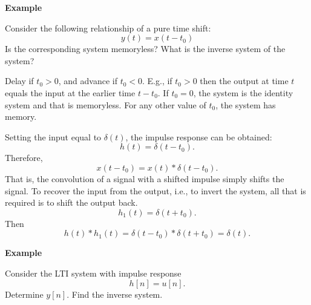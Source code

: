 \begin{frame}{}
    \textbf{ Example}\par
    Consider the following relationship of a pure time shift:
    \begin{equation*}
        y(t) = x(t-t_0)
    \end{equation*}
    Is the corresponding system memoryless? What is the inverse system of the system? \pause

    {
        Delay if $t_0 > 0$, and advance if $t_0 < 0$. E.g., if $t_0 > 0$ then the output at time $t$ equals the input at the earlier time $t-t_0$. If $t_0 = 0$, the system is the identity system  and that is memoryless. For any other value of $t_0$, the system has memory. \par
        \pause
        Setting the input equal to $\delta(t)$, the impulse response can be obtained:
        \begin{equation*}
            h(t) = \delta(t-t_0).
        \end{equation*}
        Therefore,
        \begin{equation*}
            x(t-t_0) = x(t)\ast \delta(t-t_0).
        \end{equation*}
        That is, the convolution of a signal with a shifted impulse simply shifts the signal. To recover the input from the output, i.e., to invert the system, all that is required is to shift the output back.
        \begin{equation*}
            h_1(t) = \delta(t+t_0).
        \end{equation*}
        Then
        \begin{equation*}
            h(t)\ast h_1(t) = \delta(t-t_0) \ast \delta(t+t_0) = \delta(t).
        \end{equation*}
    }
\end{frame}

\begin{frame}{}
    \textbf{ Example}\par
    Consider the LTI system with impulse response
    \begin{equation*}
        h[n] = u[n].
    \end{equation*}
    Determine $y[n]$. Find the inverse system.
    {
    }
\end{frame}


